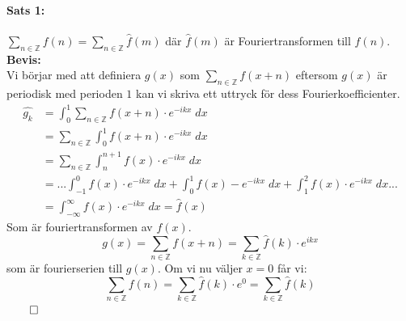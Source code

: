 \documentclass{article}%
\begin{document}
\paragraph{Sats 1:} 
$\sum\limits_{n \in \mathbb{Z}} f(n) = \sum\limits_{n \in \mathbb{Z}} \hat{f}(m)$ där $\hat{f}(m)$ är Fouriertransformen till $f(n)$.
\\
{\bf Bevis:} \\
Vi börjar med att definiera $g(x)$ som $\sum\limits_{n \in \mathbb{Z}} f(x + n)$ eftersom $g(x)$ är periodisk med perioden $1$
kan vi skriva ett uttryck för dess Fourierkoefficienter.
\begin{align*}
	\hat{g_k} &= \int_0^1 \sum_{n \in \mathbb{Z}} f(x + n) \cdot e^{-ikx}\; dx \\
			  &= \sum_{n \in \mathbb{Z}} \int_0^1 f(x + n) \cdot e^{-ikx}\; dx \\
			  &= \sum_{n \in \mathbb{Z}} \int_n^{n + 1} f(x) \cdot e^{-ikx}\; dx \\
			  &= ... \int_{-1}^0 f(x) \cdot e^{-ikx}\; dx + \int_0^1 f(x) - e^{-ikx}\; dx + \int_1^2 f(x) \cdot e^{-ikx}\; dx ... \\
			  &= \int_{- \infty}^\infty f(x) \cdot e^{-ikx}\; dx = \hat{f}(x)
\end{align*}
Som är fouriertransformen av $f(x)$.
$$g(x) = \sum_{n \in \mathbb{Z}} f(x + n) = \sum_{k \in \mathbb{Z}} \hat{f}(k) \cdot e^{ikx}$$%
som är fourierserien till $g(x)$. Om vi nu väljer $x = 0$ får vi:
$$\sum_{n \in \mathbb{Z}} f(n) = \sum_{k \in \mathbb{Z}} \hat{f}(k) \cdot e^0 = \sum_{k \in \mathbb{Z}} \hat{f}(k)$$
$\hfill \qed$
\end{document}
